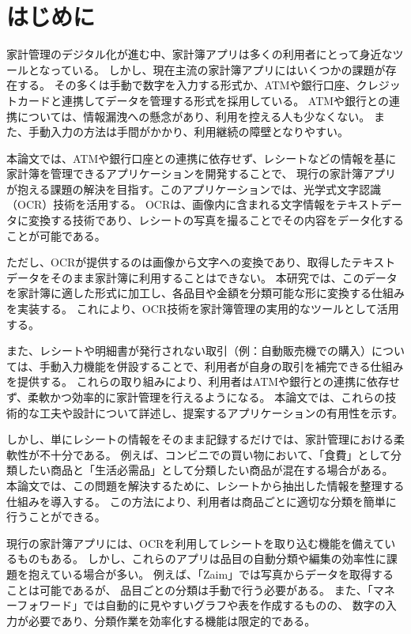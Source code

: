 \documentclass[main]{subfiles}
\begin{document}
\chapter{はじめに}
\label{cha:intro}

家計管理のデジタル化が進む中、家計簿アプリは多くの利用者にとって身近なツールとなっている。
しかし、現在主流の家計簿アプリにはいくつかの課題が存在する。
その多くは手動で数字を入力する形式か、ATMや銀行口座、クレジットカードと連携してデータを管理する形式を採用している。
ATMや銀行との連携については、情報漏洩への懸念があり、利用を控える人も少なくない。
また、手動入力の方法は手間がかかり、利用継続の障壁となりやすい。

本論文では、ATMや銀行口座との連携に依存せず、レシートなどの情報を基に家計簿を管理できるアプリケーションを開発することで、
現行の家計簿アプリが抱える課題の解決を目指す。このアプリケーションでは、光学式文字認識（OCR）技術を活用する。
OCRは、画像内に含まれる文字情報をテキストデータに変換する技術であり、レシートの写真を撮ることでその内容をデータ化することが可能である。

ただし、OCRが提供するのは画像から文字への変換であり、取得したテキストデータをそのまま家計簿に利用することはできない。
本研究では、このデータを家計簿に適した形式に加工し、各品目や金額を分類可能な形に変換する仕組みを実装する。
これにより、OCR技術を家計簿管理の実用的なツールとして活用する。

また、レシートや明細書が発行されない取引（例：自動販売機での購入）については、手動入力機能を併設することで、利用者が自身の取引を補完できる仕組みを提供する。
これらの取り組みにより、利用者はATMや銀行との連携に依存せず、柔軟かつ効率的に家計管理を行えるようになる。
本論文では、これらの技術的な工夫や設計について詳述し、提案するアプリケーションの有用性を示す。


しかし、単にレシートの情報をそのまま記録するだけでは、家計管理における柔軟性が不十分である。
例えば、コンビニでの買い物において、「食費」として分類したい商品と「生活必需品」として分類したい商品が混在する場合がある。
本論文では、この問題を解決するために、レシートから抽出した情報を整理する仕組みを導入する。
この方法により、利用者は商品ごとに適切な分類を簡単に行うことができる。

現行の家計簿アプリには、OCRを利用してレシートを取り込む機能を備えているものもある。
しかし、これらのアプリは品目の自動分類や編集の効率性に課題を抱えている場合が多い。
例えば、「Zaim」では写真からデータを取得することは可能であるが、
品目ごとの分類は手動で行う必要がある。%
また、「マネーフォワード」では自動的に見やすいグラフや表を作成するものの、
数字の入力が必要であり、分類作業を効率化する機能は限定的である。
\end{document}
